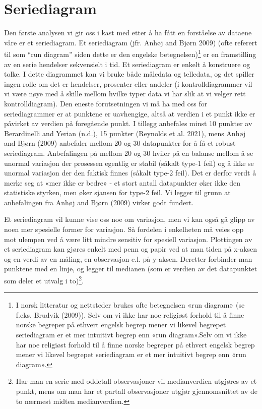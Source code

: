 \documentclass[
]{book}
\begin{document}
\hypertarget{seriediagram}{%
\chapter{Seriediagram}\label{seriediagram}}

Den første analysen vi gir oss i kast med etter å ha fått en forståelse av dataene våre er et seriediagram. Et seriediagram (jfr. Anhøj and Bjørn 2009) (ofte referert til som ``run diagram'' siden dette er den engelske betegnelsen)\footnote{I norsk litteratur og nettsteder brukes ofte betegnelsen «run diagram» (se f.eks. Brudvik (2009)). Selv om vi ikke har noe religiøst forhold til å finne norske begreper på ethvert engelsk begrep mener vi likevel begrepet seriediagram er et mer intuitivt begrep enn «run diagram».Selv om vi ikke har noe religiøst forhold til å finne norske begreper på ethvert engelsk begrep mener vi likevel begrepet seriediagram er et mer intuitivt begrep enn «run diagram».} er en framstilling av en serie hendelser sekvensielt i tid. Et seriediagram er enkelt å konstruere og tolke. I dette diagrammet kan vi bruke både måledata og telledata, og det spiller ingen rolle om det er hendelser, prosenter eller andeler (i kontrolldiagrammer vil vi være nøye med å skille mellom hvilke typer data vi har slik at vi velger rett kontrolldiagram). Den eneste forutsetningen vi må ha med oss for seriediagrammer er at punktene er uavhengige, altså at verdien i et punkt ikke er påvirket av verdien på foregående punkt. I tillegg anbefales minst 10 punkter av Berardinelli and Yerian (n.d.), 15 punkter (Reynolds et al. 2021), mens Anhøj and Bjørn (2009) anbefaler mellom 20 og 30 datapunkter for å få et robust seriediagram. Anbefalingen på mellom 20 og 30 hviler på en balanse mellom å se unormal variasjon der prosessen egentlig er stabil (såkalt type-1 feil) og å ikke se unormal variasjon der den faktisk finnes (såkalt type-2 feil). Det er derfor verdt å merke seg at «mer ikke er bedre» - et stort antall datapunkter øker ikke den statistiske styrken, men øker sjansen for type-2 feil. Vi legger til grunn at anbefalingen fra Anhøj and Bjørn (2009) virker godt fundert.

Et seriediagram vil kunne vise oss noe om variasjon, men vi kan også gå glipp av noen mer spesielle former for variasjon. Så fordelen i enkelheten må veies opp mot ulempen ved å være litt mindre sensitiv for spesiell variasjon. Plottingen av et seriediagram kan gjøres enkelt med penn og papir ved at man tiden på x-aksen og en verdi av en måling, en observasjon e.l. på y-aksen. Deretter forbinder man punktene med en linje, og legger til medianen (som er verdien av det datapunktet som deler et utvalg i to)\footnote{Har man en serie med oddetall observasjoner vil medianverdien utgjøres av et punkt, mens om man har et partall observasjoner utgjør gjennomsnittet av de to nærmest midten medianverdien.}.
\end{document}

